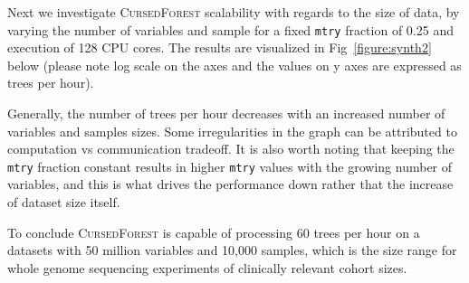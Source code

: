 \documentclass[10pt,letterpaper]{article}
\newcommand{\cursedforest}{\textsc{CursedForest}\xspace}
\newcommand{\mtry}{\texttt{mtry}\xspace}
\begin{document}
Next we investigate \cursedforest scalability with regards to the size of data, by varying the number of variables and
sample for a fixed \mtry fraction of 0.25 and execution of 128 CPU cores. The results are visualized in
Fig~\ref{figure:synth2} below (please note log scale on the axes and the values on y axes are expressed as trees per
hour).

Generally, the number of trees per hour decreases with an increased number of variables and samples sizes. Some
irregularities in the graph can be attributed to computation vs communication tradeoff. It is also worth noting that
keeping the \mtry fraction constant results in higher \mtry values with the growing number of variables, and this is
what drives the performance down rather that the increase of dataset size itself.

To conclude \cursedforest is capable of processing 60 trees per hour on a datasets with 50 million variables and 10,000
samples, which is the size range for whole genome sequencing experiments of clinically relevant cohort sizes.
\end{document}
